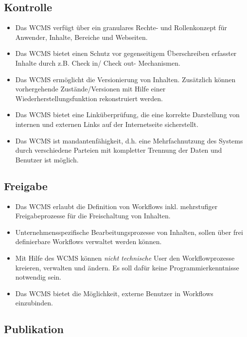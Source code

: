 
\subsection{Kontrolle}


\begin{itemize}
\item
Das WCMS verfügt über ein granulares Rechte- und Rollenkonzept für Anwender, Inhalte, Bereiche und Webseiten.
\item
Das WCMS bietet einen Schutz vor gegenseitigem Überschreiben erfasster Inhalte durch z.B. Check in/ Check out- Mechanismen.
\item
Das WCMS ermöglicht die Versionierung von Inhalten. Zusätzlich können vorhergehende Zustände/Versionen mit Hilfe einer Wiederherstellungsfunktion rekonstruiert werden.
\item
Das WCMS bietet eine Linküberprüfung, die eine korrekte Darstellung von internen und externen Links auf der Internetseite sicherstellt.
\item
Das WCMS ist mandantenfähigkeit, d.h. eine Mehrfachnutzung des Systems durch verschiedene Parteien mit kompletter Trennung der Daten und Benutzer ist möglich.
\end{itemize}


\subsection{Freigabe}

\begin{itemize}
\item
Das WCMS erlaubt die Definition von Workflows inkl. mehrstufiger Freigabeprozesse für die Freischaltung von Inhalten.
\item
Unternehmensspezifische Bearbeitungsprozesse von Inhalten, sollen über frei definierbare Workflows verwaltet werden können.
\item
Mit Hilfe des WCMS können \emph{nicht technische} User den Workflowprozesse kreieren, verwalten und ändern. Es soll dafür keine Programmierkenntnisse notwendig sein.
\item
Das WCMS bietet die Möglichkeit, externe Benutzer in Workflows einzubinden.
\end{itemize}



\subsection{Publikation}

